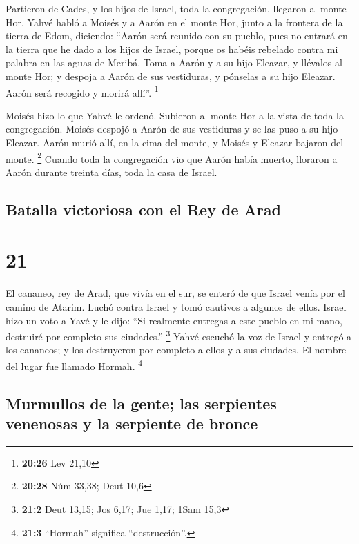  Partieron de Cades, y los hijos de Israel, toda la
congregación, llegaron al monte Hor.  Yahvé habló a
Moisés y a Aarón en el monte Hor, junto a la frontera de la tierra de
Edom, diciendo:  ``Aarón será reunido con su pueblo, pues
no entrará en la tierra que he dado a los hijos de Israel, porque os
habéis rebelado contra mi palabra en las aguas de Meribá.
 Toma a Aarón y a su hijo Eleazar, y llévalos al monte
Hor;  y despoja a Aarón de sus vestiduras, y pónselas a
su hijo Eleazar. Aarón será recogido y morirá allí''. \footnote{\textbf{20:26}
  Lev 21,10}

 Moisés hizo lo que Yahvé le ordenó. Subieron al monte
Hor a la vista de toda la congregación.  Moisés despojó a
Aarón de sus vestiduras y se las puso a su hijo Eleazar. Aarón murió
allí, en la cima del monte, y Moisés y Eleazar bajaron del monte.
\footnote{\textbf{20:28} Núm 33,38; Deut 10,6}  Cuando
toda la congregación vio que Aarón había muerto, lloraron a Aarón
durante treinta días, toda la casa de Israel.

\hypertarget{batalla-victoriosa-con-el-rey-de-arad}{%
\subsection{Batalla victoriosa con el Rey de
Arad}\label{batalla-victoriosa-con-el-rey-de-arad}}

\hypertarget{section-20}{%
\section{21}\label{section-20}}

 El cananeo, rey de Arad, que vivía en el sur, se enteró
de que Israel venía por el camino de Atarim. Luchó contra Israel y tomó
cautivos a algunos de ellos.  Israel hizo un voto a Yavé y
le dijo: ``Si realmente entregas a este pueblo en mi mano, destruiré por
completo sus ciudades.'' \footnote{\textbf{21:2} Deut 13,15; Jos 6,17;
  Jue 1,17; 1Sam 15,3}  Yahvé escuchó la voz de Israel y
entregó a los cananeos; y los destruyeron por completo a ellos y a sus
ciudades. El nombre del lugar fue llamado Hormah. \footnote{\textbf{21:3}
  ``Hormah'' significa ``destrucción''.}

\hypertarget{murmullos-de-la-gente-las-serpientes-venenosas-y-la-serpiente-de-bronce}{%
\subsection{Murmullos de la gente; las serpientes venenosas y la
serpiente de
bronce}\label{murmullos-de-la-gente-las-serpientes-venenosas-y-la-serpiente-de-bronce}}

